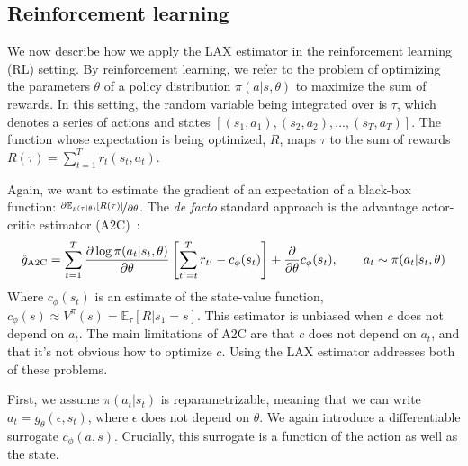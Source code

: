 \documentclass{article}
\newcommand{\E}{\mathbb{E}}
\newcommand{\LL}[1]{\frac{\partial \log \pi(a_{#1}| s_{#1}, \theta)}{\partial \theta}}
\newcommand{\LAX}{{\textnormal{LAX}}}
\begin{document}
\subsection{Reinforcement learning}
We now describe how we apply the \LAX{} estimator in the reinforcement learning (RL) setting.
By reinforcement learning, we refer to the problem of optimizing the parameters $\theta$ of a policy distribution $\pi(a | s, \theta)$ to maximize the sum of rewards.
In this setting, the random variable being integrated over is $\tau$, which denotes a series of actions and states $[(s_1, a_1), (s_2, a_2), ..., (s_T, a_T)]$.
The function whose expectation is being optimized, $R$, maps $\tau$ to the sum of rewards ${R(\tau) = \sum_{t=1}^{T} r_t(s_t, a_t)}$.

Again, we want to estimate the gradient of an expectation of a black-box function: $\nicefrac{\partial \mathbb{E}_{p(\tau|\theta)}[R(\tau)]}{\partial \theta}$.
The \emph{de facto} standard approach is the advantage actor-critic estimator (A2C)~\citep{sutton2000policy}:%
%
%
%
%
%
%
\begin{align}
\hat g_{\textnormal{A2C}} = \sum_{t=1}^T \LL{t} \left[ \sum_{t'=t}^T r_{t'} - c_\phi(s_t) \right]+\frac{\partial}{\partial\theta} c_\phi(s_t), \qquad a_t \sim \pi(a_t | s_t, \theta)
\label{eq:rl_a2c}
\end{align}
%
Where $c_\phi(s_t)$ is an estimate of the state-value function, $c_\phi(s) \approx V^\pi(s) = \E_{\tau}[R|s_1=s].$
This estimator is unbiased when $c$ does not depend on $a_t$.
The main limitations of A2C are that $c$ does not depend on $a_t$, and that it's not obvious how to optimize $c$.
Using the \LAX{} estimator addresses both of these problems.

First, we assume $\pi(a_t|s_t)$ is reparametrizable, meaning that we can write $a_t = g_\theta(\epsilon,s_t)$, where $\epsilon$ does not depend on $\theta$.
We again introduce a differentiable surrogate $c_\phi(a,s)$.
Crucially, this surrogate is a function of the action as well as the state.
\end{document}
